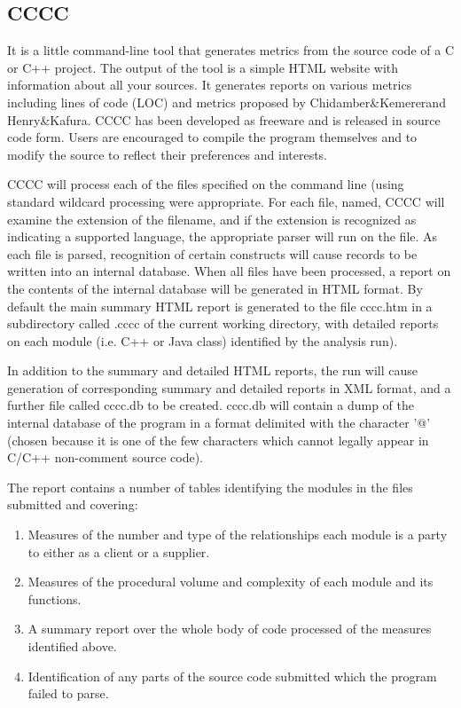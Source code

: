 \subsection{CCCC}

It is a little command-line tool that generates metrics from the source code of a C or C++ project. The output of the tool is a simple HTML website with information about all your sources. It generates reports on various metrics including lines of code (LOC) and metrics proposed by Chidamber\&Kemererand Henry\&Kafura. CCCC has been developed as freeware and is released in source code form. Users are encouraged to compile the program themselves and to modify the source to reflect their preferences and interests.

CCCC will process each of the files specified on the command line (using standard wildcard processing were appropriate. For each file, named, CCCC will examine the extension of the filename, and if the extension is recognized as indicating a supported language, the appropriate parser will run on the file. As each file is parsed, recognition of certain constructs will cause records to be written into an internal database. When all files have been processed, a report on the contents of the internal database
will be generated in HTML format. By default the main summary HTML report is generated to the file cccc.htm in a subdirectory called .cccc of the current working directory, with detailed reports on each module (i.e. C++ or Java class) identified by the analysis run).

In addition to the summary and detailed HTML reports, the run will cause generation of corresponding summary and detailed reports in XML format, and a further file called cccc.db to be created. cccc.db will contain a dump of the internal database of the program in a format delimited with the character '@' (chosen because it is one of the few characters which cannot legally appear in C/C++ non-comment source code).

The report contains a number of tables identifying the modules in the files submitted and covering:
\begin{enumerate}
	\item Measures of the number and type of the relationships each module is a party to either as a client or a supplier.
	\item Measures of the procedural volume and complexity of each module and its functions. 
	\item A summary report over the whole body of code processed of the measures identified above.
	\item Identification of any parts of the source code submitted which the program failed to parse.
\end{enumerate}

